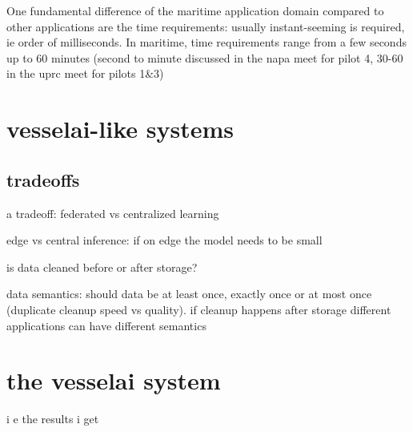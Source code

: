 One fundamental difference of the maritime application domain compared to other applications are the time requirements: usually instant-seeming is required, ie order of milliseconds. In maritime, time requirements range from a few seconds up to 60 minutes (second to minute discussed in the napa meet for pilot 4, 30-60 in the uprc meet for pilots 1&3)

\chapter{vesselai-like systems}

\section{tradeoffs}

a tradeoff: federated vs centralized learning \cite{iotsurvey}

edge vs central inference: if on edge the model needs to be small \cite{iotsurvey}

is data cleaned before or after storage?

data semantics: should data be at least once, exactly once or at most once (duplicate cleanup speed vs quality). if cleanup happens after storage different applications can have different semantics

\chapter{the vesselai system}

i e the results i get

